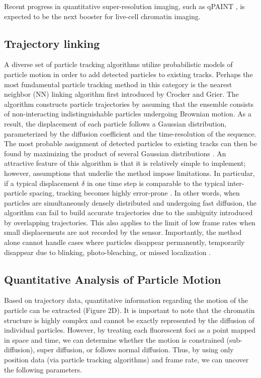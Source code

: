 Recent progress in quantitative super-resolution imaging, such as qPAINT \parencite{Jungmann2016,Culley2018,Mockl2019}, is expected to be the next booster for live-cell chromatin imaging.

\subsection{Trajectory linking}

 A diverse set of particle tracking algorithms utilize probabilistic models of particle motion in order to add detected particles to existing tracks. Perhaps the most fundamental particle tracking method in this category is the nearest neighbor (NN) linking algorithm first introduced by Crocker and Grier. The algorithm constructs particle trajectories by assuming that the ensemble consists of non-interacting indistinguishable particles undergoing Brownian motion. As a result, the displacement of each particle follows a Gaussian distribution, parameterized by the diffusion coefficient and the time-resolution of the sequence. The most probable assignment of detected particles to existing tracks can then be found by maximizing the product of several Gaussian distributions \parencite{Crocker1996}. An attractive feature of this algorithm is that it is relatively simple to implement; however, assumptions that underlie the method impose limitations. In particular, if a typical displacement $\delta$ in one time step is comparable to the typical inter-particle spacing, tracking becomes highly error-prone \parencite{Crocker1996}. In other words, when particles are simultaneously densely distributed and undergoing fast diffusion, the algorithm can fail to build accurate trajectories due to the ambiguity introduced by overlapping trajectories. This also applies to the limit of low frame rates when small displacements are not recorded by the sensor. Importantly, the method alone cannot handle cases where particles disappear permanently, temporarily disappear due to blinking, photo-bleaching, or missed localization \parencite{Sbalzarini2005}.

\subsection{Quantitative Analysis of Particle Motion}

Based on trajectory data, quantitative information regarding the motion of the particle can be extracted (Figure 2D). It is important to note that the chromatin structure is highly complex and cannot be exactly represented by the diffusion of individual particles. However, by treating each fluorescent foci as a point mapped in space and time, we can determine whether the motion is constrained (sub-diffusion), super diffusion, or follows normal diffusion. Thus, by using only position data (via particle tracking algorithms) and frame rate, we can uncover the following parameters.

